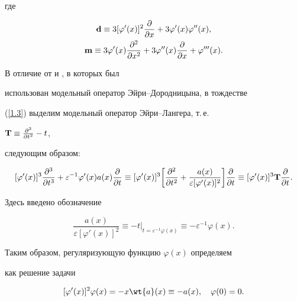 где


\begin{gather*}


\bold{d} \equiv 3 [\varphi' (x)]^2


\frac{\partial}{\partial x} + 3 \varphi' (x) \varphi'' (x),\\


\bold{m} \equiv 3 \varphi' (x)


\frac{\partial^2}{\partial x^2 } + 3 \varphi'' (x)


\frac{\partial}{\partial x} + \varphi''' (x).


\end{gather*}





В отличие от \cite{Bobochko1} и \cite{Bobochko2}, в которых был


использован модельный оператор Эйри--Дородницына, в тождестве


(\ref{1.3}) выделим модельный оператор Эйри--Лангера, т.\,е.


$\bold{T} \equiv \frac{\partial^2}{\partial t^2 } - t$,


следующим образом:


$$


[\varphi'(x)]^3 \frac{\partial^3}{\partial t^3} +


\varepsilon^{-1} \varphi'(x) a(x)\frac{\partial}{\partial t}


\equiv [\varphi'(x)]^3 \bigg[ \frac{\partial^2}{\partial


t^2} + \frac{a(x)}{\varepsilon [\varphi'(x)]^2 } \bigg


]\frac{\partial}{\partial t} \equiv [\varphi'(x)]^3


\bold{T}\frac{\partial}{\partial t}.


$$


Здесь введено обозначение


$$


\frac{a(x)}{\varepsilon [\varphi'(x)]^2 } \equiv -t


\big|_{t = \varepsilon^{-1} \varphi(x)}


\equiv -\varepsilon^{-1} \varphi (x).


$$





Таким образом, регуляризующую функцию $ \varphi (x)$ определяем


как решение задачи


\begin{equation}


\label{1.4} [\varphi' (x)]^{2}\varphi (x) = -x


\wt {a}(x) \equiv -a(x), \quad \varphi({0}) = 0.


\end{equation}





